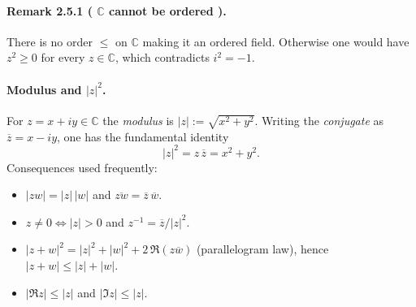 \documentclass[12pt,a4paper]{article}
\newcommand{\C}{\mathbb{C}}
\newcommand{\NumberedRemark}[3]{%
\paragraph*{Remark #1 ( #2 ).} #3\par}
\theoremstyle{plain}
\theoremstyle{definition}
\theoremstyle{remark}
\begin{document}
\NumberedRemark{2.5.1}{\(\C\) cannot be ordered}{There is no order $\le$ on $\C$ making it an ordered field. Otherwise one would have $z^2\ge 0$ for every $z\in\C$, which contradicts $i^2=-1$.}

\paragraph{Modulus and $|z|^2$.}
For $z=x+iy\in\C$ the \emph{modulus} is $|z|:=\sqrt{x^2+y^2}$. Writing the \emph{conjugate} as $\overline{z}=x-iy$, one has the fundamental identity
\[
  |z|^2 = z\,\overline{z} = x^2+y^2. 
\]
Consequences used frequently:
\begin{itemize}[leftmargin=*]
  \item $|zw|=|z|\,|w|$ and $\overline{zw}=\overline{z}\,\overline{w}$.
  \item $z\neq0 \iff |z|>0$ and $z^{-1}=\overline{z}/|z|^2$.
  \item $|z+w|^2 = |z|^2 + |w|^2 + 2\,\Re( z\overline{w} )$ (parallelogram law), hence $|z+w|\le |z|+|w|$.
  \item $|\Re z|\le |z|$ and $|\Im z|\le |z|$.
\end{itemize}
\end{document}
